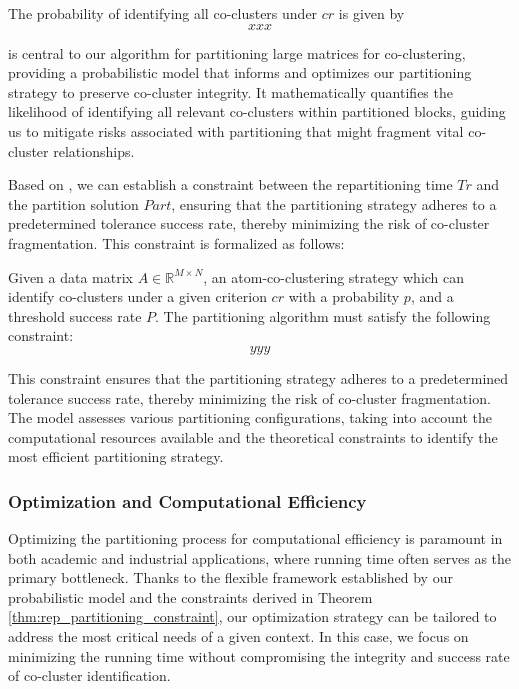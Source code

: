The probability of identifying all co-clusters under $cr$ is given by
\begin{equation}
    \label{eq:prob_of_identifying_all_co_clusters}
    xxx
\end{equation}

 is central to our algorithm for partitioning large matrices for co-clustering, providing a probabilistic model that informs and optimizes our partitioning strategy to preserve co-cluster integrity. It mathematically quantifies the likelihood of identifying all relevant co-clusters within partitioned blocks, guiding us to mitigate risks associated with partitioning that might fragment vital co-cluster relationships. 

Based on , we can establish a constraint between the repartitioning time $Tr$ and the partition solution $Part$, ensuring that the partitioning strategy adheres to a predetermined tolerance success rate, thereby minimizing the risk of co-cluster fragmentation. This constraint is formalized as follows:

\begin{theorem}
    \label{thm:rep_partitioning_constraint}
    Given a data matrix $A \in \mathbb{R}^{M \times N}$, an atom-co-clustering strategy which can identify co-clusters under a given criterion $cr$ with a probability $p$, and a threshold success rate $P$. The partitioning algorithm must satisfy the following constraint:
    \begin{equation}
        \label{eq:rep_partitioning_constraint}
        yyy
    \end{equation}
\end{theorem}


This constraint ensures that the partitioning strategy adheres to a predetermined tolerance success rate, thereby minimizing the risk of co-cluster fragmentation. The model assesses various partitioning configurations, taking into account the computational resources available and the theoretical constraints to identify the most efficient partitioning strategy. 

\subsubsection{Optimization and Computational Efficiency}
Optimizing the partitioning process for computational efficiency is paramount in both academic and industrial applications, where running time often serves as the primary bottleneck. Thanks to the flexible framework established by our probabilistic model and the constraints derived in Theorem \ref{thm:rep_partitioning_constraint}, our optimization strategy can be tailored to address the most critical needs of a given context. In this case, we focus on minimizing the running time without compromising the integrity and success rate of co-cluster identification.

